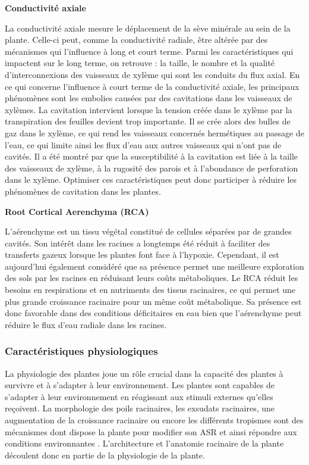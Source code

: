 \noindent \textbf{Conductivité axiale}

La conductivité axiale mesure le déplacement de la sève minérale au sein de la plante.
Celle-ci peut, comme la conductivité radiale, être altérée par des mécanismes qui l'influence à long et court terme.
Parmi les caractéristiques qui impactent sur le long terme, on retrouve : la taille, le nombre et la qualité d'interconnexions des vaisseaux de xylème qui sont les conduits du flux axial.
En ce qui concerne l'influence à court terme de la conductivité axiale, les principaux phénomènes sont les embolies causées par des cavitations dans les vaisseaux de xylèmes.
La cavitation intervient lorsque la tension créée dans le xylème par la transpiration des feuilles devient trop importante.
Il se crée alors des bulles de gaz dans le xylème, ce qui rend les vaisseaux concernés hermétiques au passage de l'eau, ce qui limite ainsi les flux d'eau aux autres vaisseaux qui n'ont pas de cavités.
Il a été montré par \cite{delzon_mechanism_2010} que la susceptibilité à la cavitation est liée à la taille des vaisseaux de xylème, à la rugosité des parois et à l'abondance de perforation dans le xylème.
Optimiser ces caractéristiques peut donc participer à réduire les phénomènes de cavitation dans les plantes.
\newline

\noindent \textbf{Root Cortical Aerenchyma (RCA)}

L'aérenchyme est un tissu végétal constitué de cellules séparées par de grandes cavités.
Son intérêt dans les racines a longtemps été réduit à faciliter des transferts gazeux lorsque les plantes font face à l'hypoxie.
Cependant, il est aujourd'hui également considéré que sa présence permet une meilleure exploration des sols par les racines en réduisant leurs coûts métaboliques.
Le RCA réduit les besoins en respirations et en nutriments des tissus racinaires, ce qui permet une plus grande croissance racinaire pour un même coût métabolique.
Sa présence est donc favorable dans des conditions déficitaires en eau bien que l'aérenchyme peut réduire le flux d'eau radiale dans les racines.


\subsubsection{Caractéristiques physiologiques}

La physiologie des plantes joue un rôle crucial dans la capacité des plantes à survivre et à s'adapter à leur environnement.
Les plantes sont capables de s'adapter à leur environnement en réagissant aux stimuli externes qu'elles reçoivent.
La morphologie des poils racinaires, les exsudats racinaires, une augmentation de la croissance racinaire ou encore les différents tropismes sont des mécanismes dont dispose la plante pour modifier son ASR et ainsi répondre aux conditions environnantes \citep{dunbabin_modelling_2013}.
L'architecture et l'anatomie racinaire de la plante découlent donc en partie de la physiologie de la plante.
\newline

